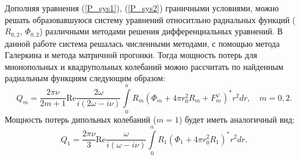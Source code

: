 \documentclass[12pt, a4paper]{article}
\def \w {\omega}
\def \ph {\varphi}
\begin{document}
Дополняя уравнения (\ref{P_sys1}), (\ref{P_sys2}) граничными условиями, можно решать образовавшуюся систему уравнений относитльно радиальных функций ($R_{0,2}$, $\Phi_{0,2}$) различными методами решения дифференциальных уравнений. В данной работе система решалась численными методами, с помощью метода Галеркина и метода матричной прогонки. Тогда мощность потерь для мнонопольных и квадрупольных колебаний можно рассчитать по найденным радиальным функциям следующим образом:
\begin{equation} 	
Q_{m} = \frac{2\pi\nu}{2m+1}\mathrm{Re} \frac{2\w}{i(2\w - i \nu)} \int\limits_0^a R_m(\Phi_m  + 4\pi r_0^2R_m + F_m^\ph)^*r^2dr, \quad m=0,2.	
\end{equation}
Мощность потерь дипольных колебаний ($m=1$) будет иметь аналогичный вид:
\begin{equation} 
Q_1 = \frac{2\pi\nu}{3} \mathrm{Re} \frac{\w}{i(\w - i\nu)} \int\limits_{0}^{a} R_{1}(\Phi_{1} + 4\pi r_{0}^{2}R_{1})^{*}r^{2}dr.
\end{equation}
\end{document}
